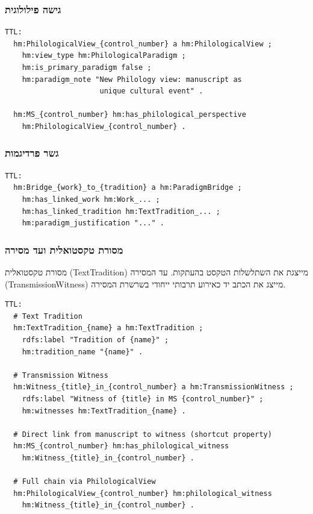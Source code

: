 \documentclass[12pt,a4paper]{article}
\begin{document}
\subsubsection{גישה פילולוגית}

\begin{LTR}
\begin{verbatim}
TTL:
  hm:PhilologicalView_{control_number} a hm:PhilologicalView ;
    hm:view_type hm:PhilologicalParadigm ;
    hm:is_primary_paradigm false ;
    hm:paradigm_note "New Philology view: manuscript as 
                      unique cultural event" .
  
  hm:MS_{control_number} hm:has_philological_perspective
    hm:PhilologicalView_{control_number} .
\end{verbatim}
\end{LTR}

\subsubsection{גשר פרדיגמות}

\begin{LTR}
\begin{verbatim}
TTL:
  hm:Bridge_{work}_to_{tradition} a hm:ParadigmBridge ;
    hm:has_linked_work hm:Work_... ;
    hm:has_linked_tradition hm:TextTradition_... ;
    hm:paradigm_justification "..." .
\end{verbatim}
\end{LTR}

\subsubsection{מסורת טקסטואלית ועד מסירה}

מסורת טקסטואלית \textenglish{(TextTradition)} מייצגת את השתלשלות הטקסט בהעתקות. עד המסירה \textenglish{(TransmissionWitness)} מייצג את הכתב יד כאירוע תרבותי ייחודי בשרשרת המסירה.

\begin{LTR}
\begin{verbatim}
TTL:
  # Text Tradition
  hm:TextTradition_{name} a hm:TextTradition ;
    rdfs:label "Tradition of {name}" ;
    hm:tradition_name "{name}" .
  
  # Transmission Witness
  hm:Witness_{title}_in_{control_number} a hm:TransmissionWitness ;
    rdfs:label "Witness of {title} in MS {control_number}" ;
    hm:witnesses hm:TextTradition_{name} .
  
  # Direct link from manuscript to witness (shortcut property)
  hm:MS_{control_number} hm:has_philological_witness
    hm:Witness_{title}_in_{control_number} .
  
  # Full chain via PhilologicalView
  hm:PhilologicalView_{control_number} hm:philological_witness
    hm:Witness_{title}_in_{control_number} .
\end{verbatim}
\end{LTR}
\end{document}
